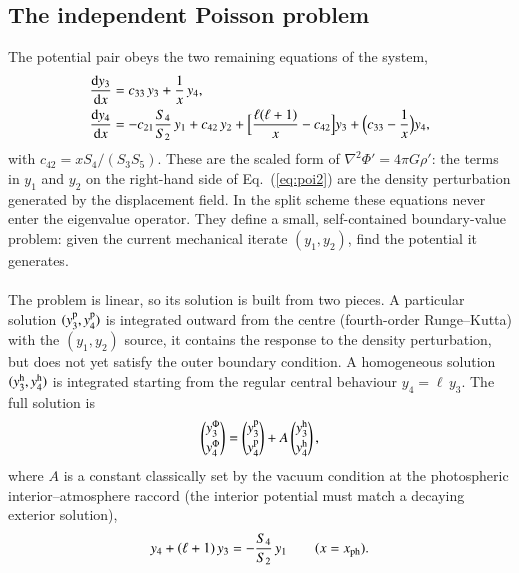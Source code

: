 \documentclass[]{aa}
\begin{document}
\subsection{The independent Poisson problem}
\label{sec:poissonbvp}
The potential pair obeys the two remaining equations of the system,
\begin{align}
  \frac{{\rm d}y_3}{{\rm d}x} &= c_{33}\,y_3+\frac{1}{x}\,y_4,
  \label{eq:poi1}\\
  \frac{{\rm d}y_4}{{\rm d}x} &= -c_{21}\frac{S_4}{S_2}\,y_1+c_{42}\,y_2
     +\Big[\frac{\ell(\ell+1)}{x}-c_{42}\Big]y_3
     +\Big(c_{33}-\frac{1}{x}\Big)y_4,
  \label{eq:poi2}
\end{align}
with $c_{42}=xS_4/(S_3S_5)$.  These are the scaled form of $\nabla^2\Phi'=4\pi G\rho'$: the terms in $y_1$ and $y_2$ on the right-hand side of Eq.~(\ref{eq:poi2}) are the density perturbation generated by the displacement field.  In the split scheme these equations never enter the eigenvalue operator.  They define a small, self-contained boundary-value problem: given the current mechanical iterate $(y_1,y_2)$, find the potential it generates.
\\~\\The problem is linear, so its solution is built from two pieces.  A particular solution $(y_3^{\rm p},y_4^{\rm p})$ is integrated outward from the centre (fourth-order Runge--Kutta) with the $(y_1,y_2)$ source, it contains the response to the density perturbation, but does not yet satisfy the outer boundary condition.  A homogeneous solution $(y_3^{\rm h},y_4^{\rm h})$ is integrated starting from the regular central behaviour $y_4=\ell\,y_3$. The full solution is
\begin{equation}
  \begin{pmatrix}y_3^\Phi\\[2pt] y_4^\Phi\end{pmatrix}
  =\begin{pmatrix}y_3^{\rm p}\\[2pt] y_4^{\rm p}\end{pmatrix}
  + A \begin{pmatrix}y_3^{\rm h}\\[2pt] y_4^{\rm h}\end{pmatrix},
  \label{eq:phABC}
\end{equation}
where $A$ is a constant classically set by the vacuum condition at the photospheric interior--atmosphere raccord (the interior potential must match a decaying exterior solution),
\begin{equation}
  y_4+(\ell+1)\,y_3=-\frac{S_4}{S_2}\,y_1 \qquad (x=x_{\rm ph}).
  \label{eq:surfBC}
\end{equation}
\end{document}
